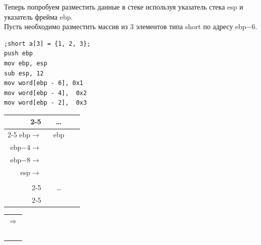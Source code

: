 \documentclass[12pt, letterpaper]{article}
\begin{document}
Теперь попробуем разместить данные в стеке используя указатель стека esp и указатель фрейма ebp.\\
Пусть необходимо разместить массив из 3 элементов типа short по адресу ebp$-$6.\\
\begin{verbatim}
;short a[3] = {1, 2, 3};
push ebp
mov ebp, esp
sub esp, 12
mov word[ebp - 6], 0x1
mov word[ebp - 4],  0x2
mov word[ebp - 2],  0x3
\end{verbatim}
\begin{minipage}{.4\textwidth}
    \centering
    \begin{tabular}{r||m{1em}|m{1em}|m{1em}|m{1em}||l}
        \cline{2-5}
        &\multicolumn{4}{|c||}{\dots} &\\
        \cline{2-5}
        ebp$\longrightarrow$ &\multicolumn{4}{|c||}{\cellcolor{blue!=40} ebp} &\\
        \hhline{~----~}
        ebp$-$4$\longrightarrow$ & & & & & \\
        \hhline{~----~}
        ebp$-$8$\longrightarrow$  &  &  &  \cellcolor{green!=40}   &  &  \\
        \hhline{~----~}
        esp$\longrightarrow$  & \cellcolor{red!=40} &  & &  & \\
        \hhline{~----~}
        & &  &  &  & \\
        \cline{2-5}
        &\multicolumn{4}{|c||}{\dots} &\\
        \cline{2-5}
    \end{tabular}
    \centering
\end{minipage}%
\begin{minipage}{.1\textwidth}
    \raggedleft
    \begin{tabular}{c}
        $\Rightarrow$\\
        \\
        \\
        \\
        \\
        \\
        
    \end{tabular}
    \centering
\end{minipage}
\end{document}
